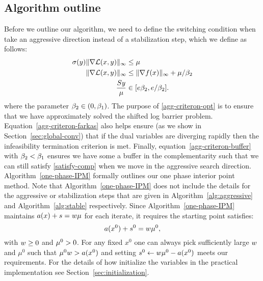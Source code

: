 \documentclass{article}
\begin{document}
\subsection{Algorithm outline}

Before we outline our algorithm, we need to define the switching condition when take an aggressive direction instead of a stabilization step, which we define as follows:
\begin{subequations}\label{agg-criteron}
\begin{flalign}
\sigma (y) \| \nabla \mathcal{L}(x, y) \|_{\infty} &\le \mu   \label{agg-criteron-opt} \\
\| \nabla \mathcal{L}(x, y) \|_{\infty} &\le  \| \nabla f(x) \|_{\infty} + \mu / \beta_{2} \label{agg-criteron-farkas} \\
 \frac{S y}{\mu} &\in [ e \beta_{2}, e / \beta_{2} ]. \label{agg-criteron-buffer}
\end{flalign}
\end{subequations}
where the parameter $\beta_{2} \in (0, \beta_{1})$. The purpose of \eqref{agg-criteron-opt} is to ensure that we have approximately solved the shifted log barrier problem. Equation~\eqref{agg-criteron-farkas} also helps ensure (as we show in Section~\ref{sec:global-conv}) that if the dual variables are diverging rapidly then the infeasibility termination criterion is met. Finally, equation~\eqref{agg-criteron-buffer} with $\beta_{2} < \beta_{1}$ ensures we have some a buffer in the complementarity such that we can still satisfy \eqref{satisfy-comp} when we move in the aggressive search direction. Algorithm~\ref{one-phase-IPM} formally outlines our one phase interior point method. Note that Algorithm~\ref{one-phase-IPM} does not include the details for the aggressive or stabilization steps that are given in Algorithm~\ref{alg:aggressive} and Algorithm~\ref{alg:stable} respectively. Since Algorithm~\ref{one-phase-IPM} maintains $a(x) + s = w \mu$ for each iterate, it requires the starting point satisfies:
$$
a(x^{0}) + s^{0} = w \mu^{0},
$$
with $w \ge 0$ and $\mu^{0} > 0$. For any fixed $x^{0}$ one can always pick sufficiently large $w$ and $\mu^{0}$ such that $\mu^{0} w > a(x^{0})$ and setting $s^{0} \gets w \mu^{0} - a(x^{0})$ meets our requirements. For the details of how initialize the variables in the practical implementation see Section~\ref{sec:initialization}.
\end{document}
